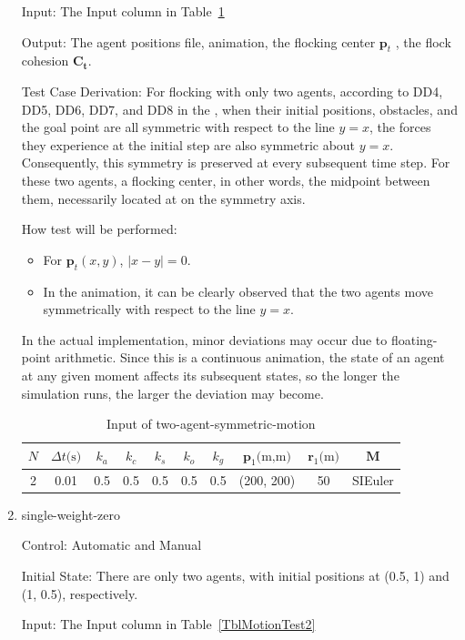 \documentclass[12pt, titlepage]{article}
\begin{document}
\begin{enumerate}
Input: The Input column in Table~\ref{TblMotionTest1}
					
Output: The agent positions file, animation, the flocking center $\mathbf{p}_t$ , the flock 
cohesion $\mathbf{C}_\mathbf{t}$.

Test Case Derivation: For flocking with only two agents, according to DD4, 
DD5, DD6, DD7, and DD8 in the \citet{SRS}, when their initial positions, 
obstacles, and the goal point are all symmetric with respect to the line $y=x$, 
the forces they experience at the initial step are also symmetric about 
$y=x$. Consequently, this symmetry is preserved at every subsequent time step. 
For these two agents, a flocking center, in other words, the midpoint between 
them, necessarily located at on the symmetry axis.

How test will be performed: 
\begin{itemize}
\item For  $\mathbf{p}_t(x,y)$, $|x-y|=0$.
\item In the animation, it can be clearly observed that the two agents move 
symmetrically with respect to the line $y=x$.
\end{itemize}
In the actual implementation, minor deviations may occur due to floating-point 
arithmetic. Since this is a continuous animation, the state of an agent at 
any given moment affects its subsequent states, so the longer the simulation 
runs, the larger the deviation may become.

\begin{longtable}{c c c c c c c c c c}
\caption{Input of two-agent-symmetric-motion} \label{TblMotionTest1} \\
\hline
$N$ & ${\Delta t}\text{(s)}$ & $k_a$ & $k_c$ & $k_s$ & $k_o$ & $k_g$ & $\mathbf{p}_1\text{(m,m)}$ & $\mathbf{r}_1\text{(m)}$ & $\mathbf{M}$ \\
\hline
2 & 0.01 & 0.5 & 0.5 & 0.5 & 0.5 & 0.5 & (200, 200) & 50 & SIEuler \\
\hline
\end{longtable}

\item{single-weight-zero\\} \label{zeroWeightTest}

Control: Automatic and Manual
					
Initial State: There are only two agents, with initial positions at (0.5, 1) 
and (1, 0.5), respectively.
					
Input: The Input column in Table~\ref{TblMotionTest2}
					

\end{enumerate}
\end{document}
